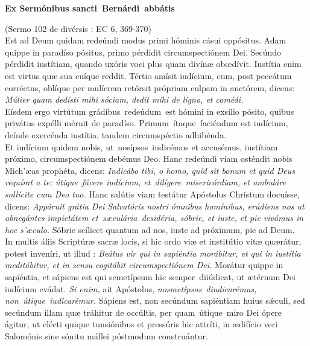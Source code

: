 \documentclass[options]{article}
\begin{document}
	\textbf{Ex Sermónibus sancti Bernárdi abbátis}
	
	(Sermo 102 de divérsis : EC 6, 369-370)\\
	
	
	Est ad Deum quidam redeúndi modus primi hóminis cásui oppósitus. Adam quippe in paradíso pósitus, primo pérdidit circumspectiónem Dei. Secúndo pérdidit iustítiam, quando uxóris voci plus quam divínæ obœdívit. Iustítia enim est virtus quæ sua cuíque reddit. Tértio amísit iudícium, cum, post peccátum corréctus, oblíque per mulíerem retórsit própriam culpam in auctórem, dicens: 
	\textit{Múlier quam dedísti mihi sóciam, dedit mihi de ligno, et comédi.}\\
	
Eísdem ergo virtútum grádibus redeúdum est hómini in exsílio pósito, quibus privátus expélli méruit de paradíso. Primum ítaque faciéndum est iudícium, deínde exercénda iustítia, tandem circumspéctio adhibénda. \\
Et iudícium quidem nobis, ut nosípsos iudicémus et accusémus, iustítiam próximo, circumspectiónem debémus Deo. Hanc redeúndi viam osténdit nobis Mich'{æ}as prophéta, dicens:
	\textit{Indicábo tibi, o homo, quid sit bonum et quid Deus requírat a te:
		útique fácere iudícium, et dilígere misericórdiam, et ambuláre sollícite cum Deo tuo.}
	Hanc salútis viam testátur Apóstolus Christum docuísse, dicens: 
	\textit{Appáruit grátia Dei Salvatóris nostri ómnibus homínibus, erúdiens nos ut abnegántes impietátem et sæculária desidéria, sóbrie, et iuste, et pie vivámus in hoc s'{æ}culo.}
	Sóbrie scílicet quantum ad nos, iuste ad próximum, pie ad Deum.\\
	
	In multis áliis Scriptúræ sacræ locis, si hic ordo viæ et institútio vitæ quærátur, potest inveníri, ut illud : 
	\textit{Beátus vir qui in sapiéntia morábitur, et qui in iustítia meditábitur, et in sensu cogitábit circumspectiónem Dei.}
	Morátur quippe in sapiéntia, et sápiens est qui semetípsum hic semper diiúdicat, ut ætérnum Dei iudícium evádat. 
	\textit{Si enim,}
	ait Apóstolus,
	\textit{nosmetípsos diudicarémus, non útique iudicarémur.}
	Sápiens est, non secúndum sapiéntiam huius s\'{æ}culi, sed secúndum illam quæ tráhitur de occúltis, per quam útique miro Dei ópere ágitur, ut elécti quique tunsiónibus et pressúris hic attríti, in ædifício veri Salomónis sine sónitu mállei póstmodum construántur.
	

	
\end{document}
